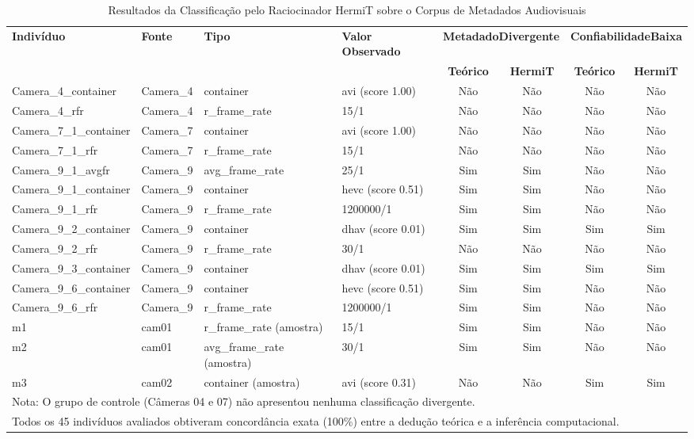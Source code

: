 \begin{table}[t]
\centering
\small
\caption{Resultados da Classificação pelo Raciocinador HermiT sobre o Corpus de Metadados Audiovisuais}
\label{tab:validacao-hermit}
\begin{tabular}{llllcccc}
\hline
\textbf{Indivíduo} & \textbf{Fonte} & \textbf{Tipo} & \textbf{Valor Observado} & \multicolumn{2}{c}{\textbf{MetadadoDivergente}} & \multicolumn{2}{c}{\textbf{ConfiabilidadeBaixa}} \\
 & & & & \textbf{Teórico} & \textbf{HermiT} & \textbf{Teórico} & \textbf{HermiT} \\
\hline
Camera\_4\_container & Camera\_4 & container & avi (score 1.00) & Não & Não & Não & Não \\
Camera\_4\_rfr & Camera\_4 & r\_frame\_rate & 15/1 & Não & Não & Não & Não \\
Camera\_7\_1\_container & Camera\_7 & container & avi (score 1.00) & Não & Não & Não & Não \\
Camera\_7\_1\_rfr & Camera\_7 & r\_frame\_rate & 15/1 & Não & Não & Não & Não \\
Camera\_9\_1\_avgfr & Camera\_9 & avg\_frame\_rate & 25/1 & Sim & Sim & Não & Não \\
Camera\_9\_1\_container & Camera\_9 & container & hevc (score 0.51) & Sim & Sim & Não & Não \\
Camera\_9\_1\_rfr & Camera\_9 & r\_frame\_rate & 1200000/1 & Sim & Sim & Não & Não \\
Camera\_9\_2\_container & Camera\_9 & container & dhav (score 0.01) & Sim & Sim & Sim & Sim \\
Camera\_9\_2\_rfr & Camera\_9 & r\_frame\_rate & 30/1 & Não & Não & Não & Não \\
Camera\_9\_3\_container & Camera\_9 & container & dhav (score 0.01) & Sim & Sim & Sim & Sim \\
Camera\_9\_6\_container & Camera\_9 & container & hevc (score 0.51) & Sim & Sim & Não & Não \\
Camera\_9\_6\_rfr & Camera\_9 & r\_frame\_rate & 1200000/1 & Sim & Sim & Não & Não \\
m1 & cam01 & r\_frame\_rate (amostra) & 15/1 & Sim & Sim & Não & Não \\
m2 & cam01 & avg\_frame\_rate (amostra) & 30/1 & Sim & Sim & Não & Não \\
m3 & cam02 & container (amostra) & avi (score 0.31) & Não & Não & Sim & Sim \\
\hline
\multicolumn{8}{l}{\footnotesize Nota: O grupo de controle (Câmeras 04 e 07) não apresentou nenhuma classificação divergente.} \\
\multicolumn{8}{l}{\footnotesize Todos os 45 indivíduos avaliados obtiveram concordância exata (100\%) entre a dedução teórica e a inferência computacional.} \\
\hline
\end{tabular}
\end{table}